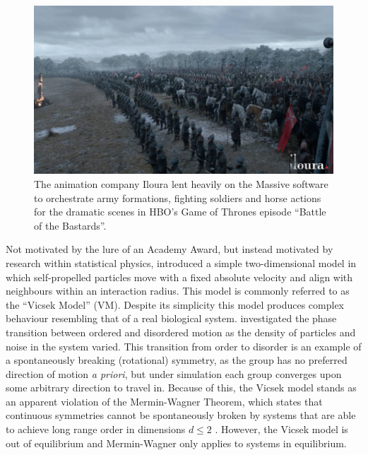 \begin{figure}[tb]
    \includegraphics[width=\textwidth]{GOT.jpg}
    \caption{The animation company Iloura lent heavily on the Massive software
        to orchestrate army formations, fighting soldiers and horse actions for the
        dramatic scenes in HBO's Game of Thrones episode ``Battle of the Bastards''.}
    \label{fig:got}
\end{figure}

Not motivated by the lure of an Academy Award, but instead motivated by
research within statistical physics, \textcite{vicsek95} introduced a simple
two-dimensional model in which self-propelled particles move with a fixed
absolute velocity and align with neighbours within an interaction radius. This
model is commonly referred to as the ``Vicsek Model'' (VM). Despite its
simplicity this model produces complex behaviour resembling that of a real
biological system. \textcite{vicsek95} investigated the phase transition
between ordered and disordered motion as the density of particles and noise in
the system varied. This transition from order to disorder is an example of a
spontaneously breaking (rotational) symmetry, as the group has no preferred
direction of motion \emph{a priori}, but under simulation each group converges
upon some arbitrary direction to travel in. Because of this, the Vicsek model
stands as an apparent violation of the Mermin-Wagner Theorem, which states that
continuous symmetries cannot be spontaneously broken by systems that are able
to achieve long range order in dimensions $d\leq 2$ \parencite{mermin66}.
However, the Vicsek model is out of equilibrium and Mermin-Wagner only applies
to systems in equilibrium.

